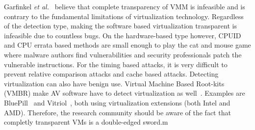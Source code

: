 Garfinkel {\em et al.}~\cite{garfinkel2007} believe that complete transparency
of VMM is infeasible and is contrary to the fundamental limitations of
virtualization technology. Regardless of the detection type, making the software
based virtualization transparent is infeasible due to countless bugs. On the
hardware-based type however, CPUID and CPU errata based methods are small enough to play the cat and mouse game where malware
authors find vulnerabilities and security professionals patch the vulnerable
instructions. For the timing based attacks, it is very difficult to prevent
relative comparison attacks and cache based attacks.
Detecting virtualization can also have benign use. Virtual Machine
Based Root-kits (VMBR) make AV software have to detect virtualization as
well~\cite{thompson, ferrie2007}. Examples are BluePill~\cite{bluepill} and
Vitriol~\cite{vitriol}, both using virtualization extensions (both Intel and
AMD). Therefore, the research community should be aware of the fact that
completly transparent VMs is a double-edged sword.m

